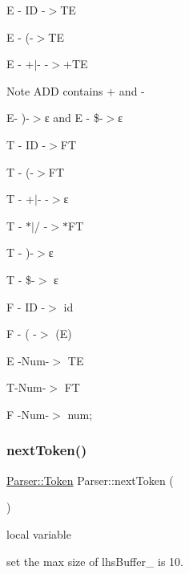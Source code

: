 E -\/ ID -\/$>$TE\textquotesingle{}

E -\/ \textquotesingle{}(\textquotesingle{}-\/$>$TE\textquotesingle{}

E\textquotesingle{} -\/ \textquotesingle{}+\textquotesingle{}$\vert$\textquotesingle{}-\/\textquotesingle{} -\/$>$+\+TE\textquotesingle{} \begin{DoxyNote}{Note}
A\+DD contains \textquotesingle{}+\textquotesingle{} and \textquotesingle{}-\/\textquotesingle{}
\end{DoxyNote}
E\textquotesingle{}-\/ \textquotesingle{})\textquotesingle{}-\/$>$ε and E\textquotesingle{} -\/ \$-\/$>$ε

T -\/ ID -\/$>$FT\textquotesingle{}

T -\/ \textquotesingle{}(\textquotesingle{}-\/$>$FT\textquotesingle{}

T\textquotesingle{} -\/ \textquotesingle{}+\textquotesingle{}$\vert$\textquotesingle{}-\/\textquotesingle{} -\/$>$ε

T\textquotesingle{} -\/ \textquotesingle{}$\ast$\textquotesingle{}$\vert$\textquotesingle{}/\textquotesingle{} -\/$>$$\ast$\+FT\textquotesingle{}

T\textquotesingle{} -\/ \textquotesingle{})\textquotesingle{}-\/$>$ε

T\textquotesingle{} -\/ \$-\/$>$ ε

F -\/ ID -\/$>$ id

F -\/ \textquotesingle{}(\textquotesingle{} -\/$>$ (E)

E -\/\+Num-\/$>$ TE\textquotesingle{}

T-\/\+Num-\/$>$ FT

F -\/\+Num-\/$>$ num; \hypertarget{class_parser_aadd9e6622f688ed2e64c0d9d1343af9c}{}\label{class_parser_aadd9e6622f688ed2e64c0d9d1343af9c} 
\subsubsection{\texorpdfstring{next\+Token()}{nextToken()}}
{\footnotesize\ttfamily \hyperlink{struct_scanner_1_1_token}{Parser\+::\+Token} Parser\+::next\+Token (\begin{DoxyParamCaption}{ }\end{DoxyParamCaption})}

local variable

set the max size of lhs\+Buffer\+\_\+ is 10. \hypertarget{class_parser_a69a4eff828356f0c9cbf94f904ef596f}{}\label{class_parser_a69a4eff828356f0c9cbf94f904ef596f} 
